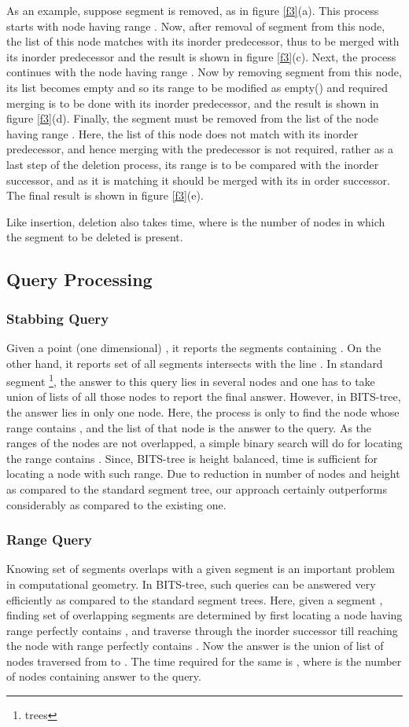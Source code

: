 \documentclass{article}
\begin{document}
As an example, suppose segment  is removed, as in figure \ref{f3}(a).  This process starts with node having range . Now, after removal of segment  from this node, the list of this node matches with its inorder predecessor, thus to be merged with its inorder predecessor and the result is shown in figure \ref{f3}(c). Next, the process continues with the node having range . Now by removing segment  from this node, its list becomes empty and so its range to be modified as empty() and required merging is to be done with its inorder predecessor, and the result is shown in figure \ref{f3}(d). Finally, the segment  must be removed from the list of the node having range . Here, the list of this node does not match with its inorder predecessor, and hence merging with the predecessor is not required, rather as a last step of the deletion process, its range is to be compared with the inorder successor, and as it is matching it should be merged with its in order successor. The final result is shown in figure \ref{f3}(e).\
\par
Like insertion, deletion also takes  time, where  is the number of nodes in which the segment to be deleted is present. 
\subsection{Query Processing} 
\subsubsection{Stabbing Query}
Given a point (one dimensional) , it reports the segments containing . On the other hand, it reports set of all segments intersects with the line . In standard segment \footnote{trees}, the answer to this query lies in several nodes and one has to take union of lists of all those nodes to report the final answer. However, in BITS-tree, the answer lies in only one node. Here, the process is only to find the node whose range contains , and the list of that node is the answer to the query. As the ranges of the nodes are not overlapped, a simple binary search will do for locating the range contains . Since, BITS-tree is height balanced,  time is sufficient for locating a node with such range. Due to reduction in number of nodes and height as compared to the standard segment tree, our approach certainly outperforms considerably as compared to the existing one.
\subsubsection{Range Query}
Knowing set of segments overlaps with a given segment is an important problem in computational geometry\cite{bcko}. In BITS-tree, such queries can be answered very efficiently as compared to the standard segment trees. Here, given a segment , finding set of overlapping segments are determined by first locating a node  having range perfectly contains , and traverse through the inorder successor till reaching the node  with range perfectly contains . Now the answer is the union of list of nodes traversed from  to . The time required for the same is , where  is the number of nodes containing answer to the query.
\end{document}
